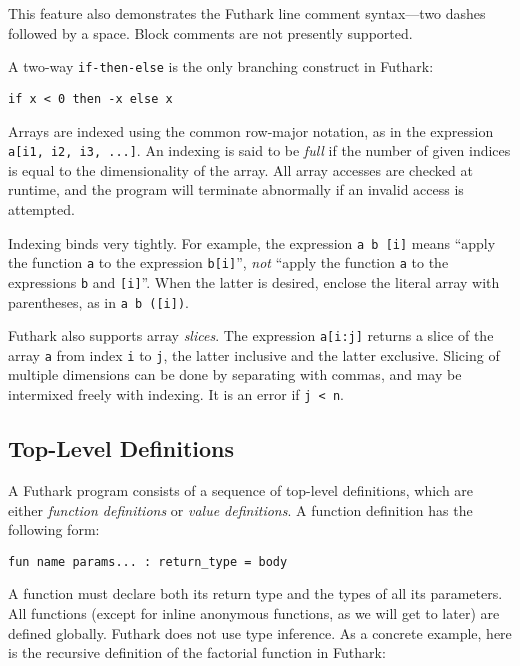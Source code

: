 \documentclass[oneside,11pt]{book}
\begin{document}
\noindent
This feature also demonstrates the Futhark line comment syntax---two dashes
followed by a space.  Block comments are not presently supported.

A two-way \texttt{if-then-else} is the only branching construct in
Futhark:

\begin{lstlisting}
if x < 0 then -x else x
\end{lstlisting}

Arrays are indexed using the common row-major notation, as in the expression
\texttt{a[i1, i2, i3, ...]}.  An indexing is said to be \textit{full} if
the number of given indices is equal to the dimensionality of the
array.  All array accesses are checked at runtime, and the program
will terminate abnormally if an invalid access is attempted.

Indexing binds very tightly.  For example, the expression
\texttt{a~b~[i]} means ``apply the function \texttt{a} to the
expression \texttt{b[i]}'', \textit{not} ``apply the function
\texttt{a} to the expressions \texttt{b} and \texttt{[i]}''.  When the
latter is desired, enclose the literal array with parentheses, as in
\texttt{a~b~([i])}.

Futhark also supports array \textit{slices}.  The expression
\texttt{a[i:j]} returns a slice of the array \texttt{a} from index
\texttt{i} to \texttt{j}, the latter inclusive and the latter
exclusive.  Slicing of multiple dimensions can be done by separating
with commas, and may be intermixed freely with indexing.  It is an
error if \texttt{j < n}.

\subsection{Top-Level Definitions}
\label{sec:function-declarations}

A Futhark program consists of a sequence of top-level definitions,
which are either \textit{function definitions} or \textit{value
  definitions}.  A function definition has the following form:

\begin{lstlisting}
fun name params... : return_type = body
\end{lstlisting}

\noindent
A function must declare both its return type and the types of all its
parameters.  All functions (except for inline anonymous functions, as
we will get to later) are defined globally.  Futhark does not use type
inference.  As a concrete example, here is the recursive definition of
the factorial function in Futhark:
\end{document}
